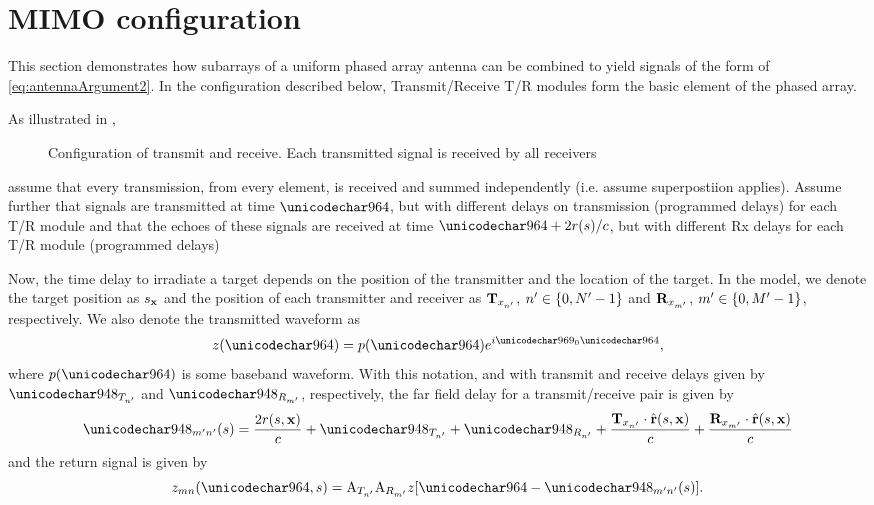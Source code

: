 \section{MIMO configuration}
\label{an:mimo}
This section demonstrates how subarrays of a uniform phased array antenna can be combined to yield signals of the form of \eqref{eq:antennaArgument2}. In the configuration described below, Transmit/Receive T/R modules form the basic element of the phased array. 
\par
As illustrated in , 
\begin{figure}[ht!]
    \resizebox{\textwidth}{!}{}
	\caption{Configuration of transmit and receive. Each transmitted signal is received by all receivers}
	\label{fg:mimo}
\end{figure}
assume that every transmission, from every element, is received and summed independently (i.e. assume superpostiion applies). Assume further that signals are transmitted at time $\fasttime$, but with different delays on transmission (programmed delays) for each T/R module
and that the echoes of these signals are received at time $\fasttime + 2\targetrange(\parm)/c$, but with different Rx delays for each T/R module (programmed delays)
\par
Now, the time delay to irradiate a target depends on the position of the transmitter and the location of the target. In the model, we denote the target position as $s_{\mathbf{x}}$ and the position of each transmitter and receiver as $\mathbf{T}_{x_{n'}}$, $n'\in\{0, N'-1\}$ and $\mathbf{R}_{x_{m'}}$, $m'\in\{0, M'-1\}$, respectively. We also denote the transmitted waveform as 
\begin{equation}
 \pulse(\fasttime)=\envelope(\fasttime)\eex{\im\omega_0\fasttime},
\end{equation}
where $\envelope(\fasttime)$ is some baseband waveform. With this notation, and with transmit and receive delays given by $\txDelay{\txn}$ and $\rxDelay{\txm}$, respectively, the far field delay for a transmit/receive pair is given by
\begin{equation}  \mnDelay(\parm) = \frac{2\amplitude\range(\parm, \targetnoparm)}{c} + \txDelay{\txn} + \rxDelay{\txn} 
+ \frac{\anTx{\txn}\cdot\uRangeVectorParm}{c} + \frac{\anRx{\txm}\cdot\uRangeVectorParm}{c}
\end{equation}
and the return signal is given by 
\begin{equation}
\pulse_{mn}(\fasttime, \parm) = \txAmp{\txn}\rxAmp{\txm}\pulse[\fasttime - \mnDelay(\parm)].
\end{equation}
